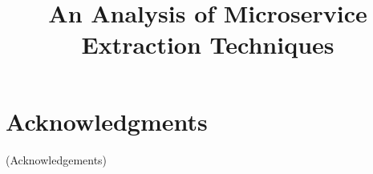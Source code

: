 \documentclass[10pt,conference]{IEEEtran}
\begin{document}
\title{An Analysis of Microservice Extraction Techniques}






 



\maketitle










\section{Acknowledgments}
(Acknowledgements)


\balance
%


\end{document}
